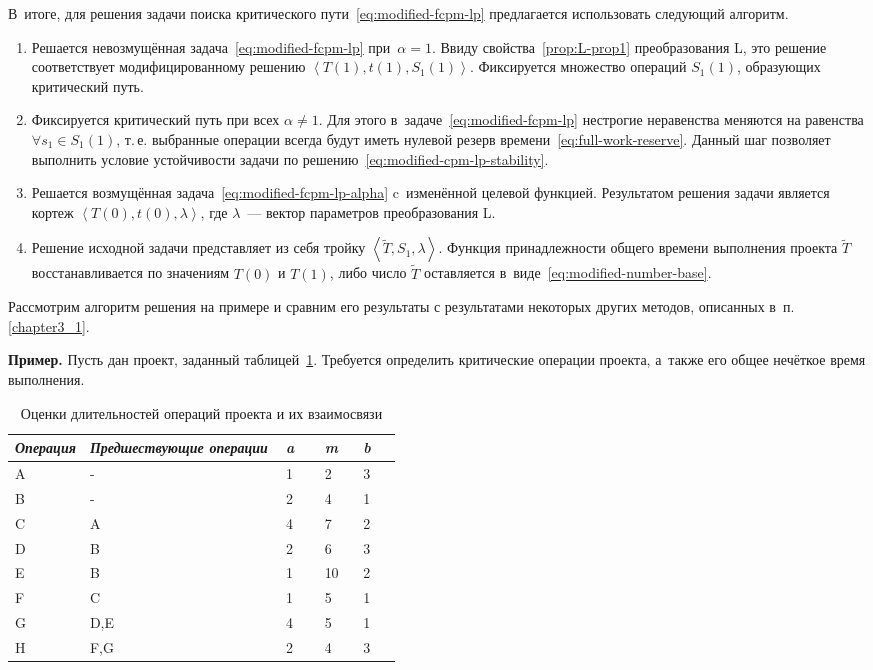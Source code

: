В~итоге, для решения задачи поиска критического пути~\eqref{eq:modified-fcpm-lp} предлагается использовать следующий алгоритм.
\begin{enumerate}
  \item Решается невозмущённая задача~\eqref{eq:modified-fcpm-lp} при~$\alpha=1$. Ввиду свойства~\ref{prop:L-prop1} преобразования L, это решение соответствует модифицированному решению $\left \langle T\left(1\right), t\left(1\right), S_1\left(1\right) \right \rangle$. Фиксируется множество операций $S_1\left(1\right)$, образующих критический путь.
  \item Фиксируется критический путь при всех $\alpha \neq 1$. Для этого в~задаче~\eqref{eq:modified-fcpm-lp} нестрогие неравенства меняются на равенства $\forall s_1 \in S_1\left(1\right)$, т.\,е. выбранные операции всегда будут иметь нулевой резерв времени~\eqref{eq:full-work-reserve}. Данный шаг позволяет выполнить условие устойчивости задачи по решению~\eqref{eq:modified-cpm-lp-stability}.
  \item Решается возмущённая задача~\eqref{eq:modified-fcpm-lp-alpha} c~изменённой целевой функцией. Результатом решения задачи является кортеж $\left \langle T\left(0\right), t\left(0\right), \lambda \right \rangle$, где $\lambda$~--- вектор параметров преобразования L.
  \item Решение исходной задачи представляет из себя тройку $\left \langle \tilde T, S_1, \lambda \right \rangle$. Функция принадлежности общего времени выполнения проекта $\tilde T$ восстанавливается по значениям $T\left(0\right)$ и $T\left(1\right)$, либо число $\tilde T$ оставляется в~виде~\eqref{eq:modified-number-base}.
\end{enumerate}
  
Рассмотрим алгоритм решения на примере и сравним его результаты с результатами некоторых других методов, описанных в~п.\,\ref{chapter3_1}.

\textbf{Пример.} Пусть дан проект, заданный таблицей~\ref{t:sample-project-estimates}. Требуется определить критические операции проекта, а~также его общее нечёткое время выполнения.

\begin{table}[b!]
\caption{Оценки длительностей операций проекта и их взаимосвязи}
\label{t:sample-project-estimates}
\begin{center}
\begin{tabularx}{0.8\textwidth}{|p{0.15\linewidth}|X|p{0.1\linewidth}|p{0.1\linewidth}|p{0.1\linewidth}|}
	\hline
		\centering \textit{Операция} & \centering \textit{Предшествующие операции} & \centering \textit{a} & \centering \textit{m} & \centering \textit{b} \tabularnewline	\hline
	\hline
		A & -   & 1 & 2  & 3 \tabularnewline \hline
		B & -   & 2 & 4  & 1 \tabularnewline \hline
		C & A   & 4 & 7  & 2 \tabularnewline \hline
		D & B   & 2 & 6  & 3 \tabularnewline \hline
		E & B   & 1 & 10 & 2 \tabularnewline \hline
		F & C   & 1 & 5  & 1 \tabularnewline \hline
		G & D,E & 4 & 5  & 1 \tabularnewline \hline
		H & F,G & 2 & 4  & 3 \tabularnewline
    \hline
\end{tabularx}
\end{center}
\end{table}

